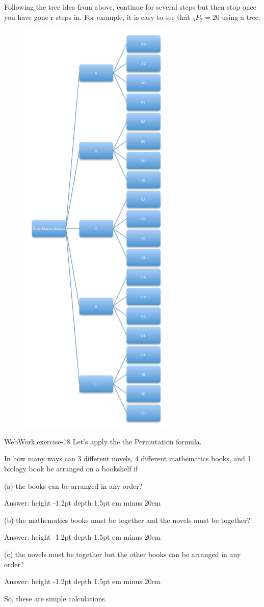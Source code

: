 \documentclass[10pt,]{book}
\newcommand{\fillin}[1]{\leavevmode\leaders\vrule height -1.2pt depth 1.5pt \hskip #1em minus #1em \null}
\numberwithin{equation}{section}
\begin{document}
Following the tree idea from above, continue for several steps but then stop once you have gone r steps in.  For example, it is easy to see that \(_5P_2 = 20\) using a tree. \begin{figure}\centering\includegraphics[width=0.5\linewidth]{images/PermutationSubTree.png}
\end{figure}%
\par
\hypertarget{p-371}{}%
\begin{inlineexercise}{WebWork.}{exercise-18}%
\hypertarget{p-372}{}%
Let's apply the the Permutation formula.%
\par\medskip
\hypertarget{p-373}{}%
In how many ways can 3 different novels, 4 different mathematics books, and 1 biology book be arranged on a bookshelf if%
\par
\hypertarget{p-374}{}%
(a) the books can be arranged in any order?%
\par
\hypertarget{p-375}{}%
Answer:  \fillin{20}%
\par
\hypertarget{p-376}{}%
(b) the mathematics books must be together and the novels must be together?%
\par
\hypertarget{p-377}{}%
Answer:  \fillin{20}%
\par
\hypertarget{p-378}{}%
(c) the novels must be together but the other books can be arranged in any order?%
\par
\hypertarget{p-379}{}%
Answer:  \fillin{20}%
\par\medskip\noindent \hypertarget{p-380}{}%
So, these are simple calculations.%
\par
\end{inlineexercise}
\end{document}
